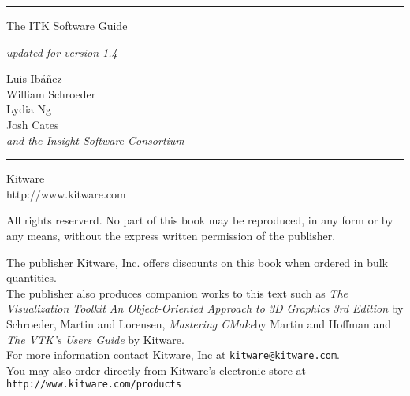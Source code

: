 
\begin{minipage}[t][3cm][b]{\textwidth}
\rule{14cm}{1pt}
\end{minipage}


\begin{minipage}[t][3cm][b]{\textwidth}
\Huge
The ITK Software Guide\\
\normalsize
\par
\emph{updated for version 1.4}\\
\end{minipage}

\hfill
\begin{minipage}[t][6cm][b]{0.6\textwidth}
\Large
\renewcommand{\baselinestretch}{1.5}
Luis Ib\'{a}\~{n}ez\\
William Schroeder\\
Lydia Ng\\
Josh Cates\\
\emph{and the Insight Software Consortium}
\normalsize
\end{minipage}


\begin{minipage}[t][2cm][b]{\textwidth}
\rule{14cm}{1pt}
\end{minipage}

\newpage

\begin{minipage}[t][3cm][b]{\textwidth}
\Huge
Kitware\\
\normalsize
http://www.kitware.com
\end{minipage}


\begin{minipage}[t][3cm][b]{\textwidth}
\begin{center}
All rights reserverd. No part of this book may be reproduced, in any form or by any means, without the express written permission of the publisher.
\end{center}
\end{minipage}


\begin{minipage}[t][3cm][b]{\textwidth}
\begin{center}
The publisher Kitware, Inc. offers discounts on this book when ordered in bulk quantities.\\
The publisher also produces companion works to this text such as \emph{The Visualization Toolkit An Object-Oriented Approach to 3D Graphics 3rd Edition} by Schroeder, Martin and Lorensen, \emph{Mastering CMake}by Martin and Hoffman and \emph{The VTK's Users Guide} by Kitware.\\
For more information contact Kitware, Inc at \texttt{kitware@kitware.com}.\\
You may also order directly from Kitware's electronic store at \texttt{http://www.kitware.com/products}\\
\end{center}
\end{minipage}


